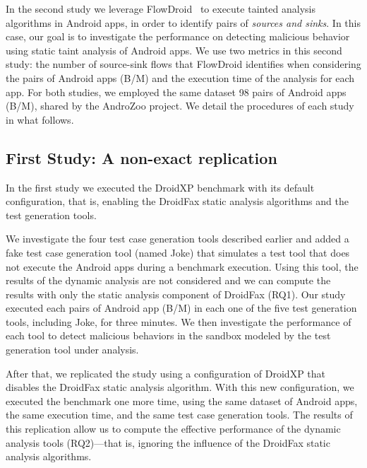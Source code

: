 In the second study we leverage FlowDroid~\cite{DBLP:conf/pldi/ArztRFBBKTOM14} to execute
tainted analysis algorithms in Android apps, in order to identify pairs of \emph{sources and sinks}. In this case,
our goal is to investigate the performance on detecting malicious
behavior using static taint analysis of Android apps. We use two metrics in this second study: the number
of source-sink flows that FlowDroid identifies when considering the pairs of Android apps (B/M) and the
execution time of the analysis for each app.
For both studies, we employed the same dataset 98 pairs of Android apps (B/M),
shared by the AndroZoo \cite{DBLP:conf/msr/AllixBKT16} project. We detail the procedures of each study in what follows.

\subsection{First Study: A non-exact replication}

In the first study we executed the DroidXP benchmark with its
default configuration, that is, enabling the DroidFax
static analysis algorithms and the test generation tools.

We investigate the four test case generation tools described earlier and added a fake test
case generation tool (named Joke) that simulates a test tool that does not execute
the Android apps during a benchmark execution. Using this tool, the results
of the dynamic analysis are not considered and we can compute the results with
only the static analysis component of DroidFax (RQ1). Our study executed each pairs of
Android app (B/M) in each one of the five test generation tools, including Joke,
for three minutes. We then investigate the performance of each tool to detect
malicious behaviors in the sandbox modeled by the test generation tool
under analysis.



After that, we replicated the study using a configuration of DroidXP that
disables the DroidFax static analysis algorithm. With this new configuration,
we executed the benchmark one more time, using the same dataset of Android
apps, the same execution time, and the same test case generation tools.
The results of this replication allow us to compute the effective performance
of the dynamic analysis tools (RQ2)---that is, ignoring the influence of the
DroidFax static analysis algorithms.

